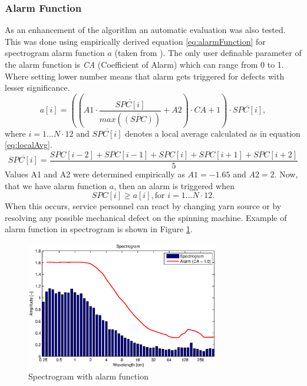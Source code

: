 \documentclass[twoside]{ctuthesis}
\theoremstyle{plain}
\theoremstyle{definition}
\theoremstyle{note}
\begin{document}
\subsubsection{Alarm Function}
As an enhancement of the algorithm an automatic evaluation was also tested. This was done using empirically derived equation \ref{eq:alarmFunction} for spectrogram alarm function $a$ (taken from \cite{cite:1}). The only user definable parameter of the alarm function is \textit{CA} (Coefficient of Alarm) which can range from 0 to 1. Where setting lower number means that alarm gets triggered for defects with lesser significance.
\begin{equation} \label{eq:alarmFunction}
	a[i] = \left(\left( A1\cdot \frac{\overline{SPC[i]}}{max(\overline{(SPC)})}+A2\right) \cdot CA + 1 \right) \cdot \overline{SPC[i]},
\end{equation}
where $i=1\ldots N \cdot 12$ and $\overline{SPC[i]}$ denotes a local average calculated as in equation \ref{eq:localAvg}.
\begin{equation} \label{eq:localAvg}
	\overline{SPC[i]} = \frac{SPC[i-2]+SPC[i-1]+SPC[i]+SPC[i+1]+SPC[i+2]}{5}
\end{equation}
Values A1 and A2 were determined empirically as $A1=-1.65$ and $A2=2$.
Now, that we have alarm function $a$, then an alarm is triggered when
\begin{equation} \label{eq:alarmTrig}
	SPC[i] \geq a[i], \text{for } i=1\ldots N \cdot 12.
\end{equation}
When this occurs, service personnel can react by changing yarn source or by resolving any possible mechanical defect on the spinning machine. Example of alarm function in spectrogram is shown in Figure \ref{fig:alarm1}.
\begin{figure}[h]
	\centering
	\includegraphics[width=0.75\textwidth]{prize1_alarm.eps}
	\caption{Spectrogram with alarm function}
	\label{fig:alarm1}
\end{figure}
\end{document}
